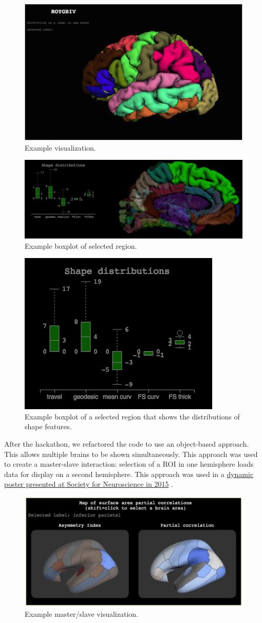 \documentclass[twocolumn]{bmcart}%
\begin{document}
\begin{figure}[h!] \includegraphics[width=.42\textwidth]{roygbiv.png} \caption{\label{centfig} Example visualization.} \end{figure}

\begin{figure}[h!] \includegraphics[width=.42\textwidth]{d3_boxplot.png} \caption{\label{d3box} Example boxplot of selected region.} \end{figure}

\begin{figure}[h!] \includegraphics[width=.42\textwidth]{d3_boxplot_alone.png} \caption{\label{d3boxalone} Example boxplot of a selected region that shows the distributions of shape features.} \end{figure}

After the hackathon, we refactored the code to use an object-based
approach. This allows multiple brains to be shown simultaneously. This
approach was used to create a master-slave interaction: selection of a
ROI in one hemisphere loads data for display on a second hemisphere.
This approach was used in a
\href{http://cseweb.ucsd.edu/~bcipolli/docs/posters/SfN2015/}{dynamic
poster presented at Society for Neuroscience in 2015}
\cite{Cipollini2015}.

\begin{figure}[h!] \includegraphics[width=.42\textwidth]{roygbiv-master-slave.png} \caption{\label{master} Example master/slave visualization.} \end{figure}
\end{document}
